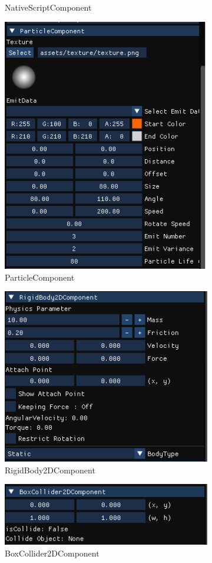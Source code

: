 \begin{figure}[h]
\begin{subfigure}[b]{0.5\linewidth}
        \caption{NativeScriptComponent}
    \end{subfigure}
    \begin{subfigure}[b]{0.5\linewidth}
        \includegraphics[width=0.5\linewidth]{./resources/editor/ins_particle.png}
        \caption{ParticleComponent}
    \end{subfigure}
    \begin{subfigure}[b]{0.5\linewidth}
        \includegraphics[width=0.5\linewidth]{./resources/editor/ins_rigidbody2D.png}
        \caption{RigidBody2DComponent}
    \end{subfigure}
    \begin{subfigure}[b]{0.5\linewidth}
        \includegraphics[width=0.5\linewidth]{./resources/editor/ins_boxCollider2D.png}
        \caption{BoxCollider2DComponent}
    \end{subfigure}
    \begin{subfigure}[b]{0.5\linewidth}

\end{subfigure}
\end{figure}

